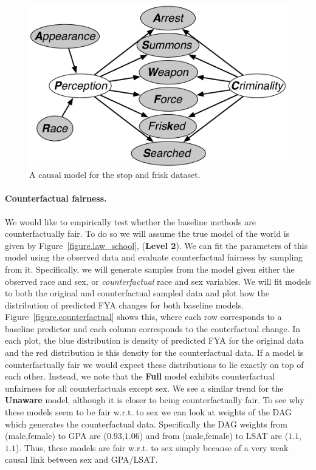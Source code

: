 \begin{figure}[th]
\begin{center}
\vspace{-1ex}
\centerline{\includegraphics[width=\columnwidth]{stop_and_frisk_model3.pdf}}
\vspace{-2ex}
\caption{A causal model for the stop and frisk dataset.\label{figure.stop_and_frisk}\vspace{-4ex}}
\vspace{-2ex}
\end{center}
\end{figure}

\paragraph{Counterfactual fairness.}
We would like to empirically test whether the baseline methods are counterfactually fair. To do so we will assume the true model of the world is given by Figure~\ref{figure.law_school}, (\textbf{Level 2}). We can fit the parameters of this model using the observed data and evaluate counterfactual fairness by sampling from it. Specifically, we will generate samples from the model given either the observed race and sex, or \emph{counterfactual} race and sex variables. We will fit models to both the original and counterfactual sampled data and plot how the distribution of predicted FYA changes for both baseline models. Figure~\ref{figure.counterfactual} shows this, where each row corresponds to a baseline predictor and each column corresponds to the couterfactual change. In each plot, the blue distribution is density of predicted FYA for the original data and the red distribution is this density for the counterfactual data. If a model is counterfactually fair we would expect these distributions to lie exactly on top of each other. Instead, we note that the \textbf{Full} model exhibits counterfactual unfairness for all counterfactuals except sex. We see a similar trend for the \textbf{Unaware} model, although it is closer to being counterfactually fair. To see why these models seem to be fair w.r.t. to sex we can look at weights of the DAG which generates the counterfactual data. Specifically the DAG weights from (male,female) to GPA are ($0.93$,$1.06$) and from (male,female) to LSAT are ($1.1$,$1.1$). Thus, these models are fair w.r.t. to sex simply
because of a very weak causal link between sex and GPA/LSAT.

